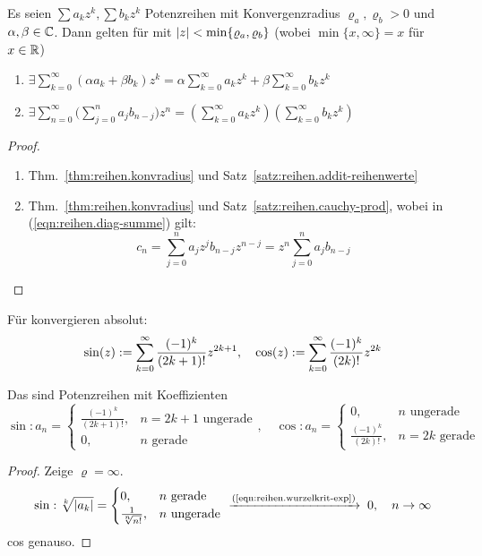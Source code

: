 \documentclass[12pt]{scrreprt}
\begin{document}
\begin{satz}\label{bsp:reihen.potreihe-reg}
Es seien $\sum a_kz^k, \sum b_kz^k$ Potenzreihen mit Konvergenzradius $\varrho_a, \varrho_b > 0$ und $\alpha, \beta \in \mathbb{C}$.
Dann gelten für  mit $\left\lvert z\right\lvert < \min \{\varrho_a, \varrho_b\}$ (wobei $\min \{x, \infty\} = x$ für $x\in\mathbb{R}$)
\begin{enumerate}
\item $\exists \sum\limits_{k=0}^\infty (\alpha a_k + \beta b_k) z^k = \alpha \sum\limits_{k=0}^\infty a_kz^k + \beta \sum\limits_{k=0}^\infty b_kz^k$\label{bsp:reihen.potreihe-reg.a}

\item $\exists \sum\limits_{n=0}^\infty \biggl(\sum\limits_{j=0}^n a_jb_{n-j}\biggr)z^n = \left(\sum\limits_{k=0}^\infty a_kz^k\right)\left(\sum\limits_{k=0}^\infty b_kz^k\right)$\label{bsp:reihen.potreihe-reg.b}
\end{enumerate}
\end{satz}
\begin{proof}
\begin{enumerate}
\item Thm.~\ref{thm:reihen.konvradius} und Satz~\ref{satz:reihen.addit-reihenwerte}
\item Thm.~\ref{thm:reihen.konvradius} und Satz~\ref{satz:reihen.cauchy-prod}, wobei in (\ref{eqn:reihen.diag-summe}) gilt:
\[c_n = \sum_{j=0}^n a_jz^jb_{n-j}z^{n-j} = z^n \sum_{j=0}^n a_j b_{n-j}\]
\end{enumerate}
\end{proof}

\begin{bsp}\label{bsp:reihen.sin-cos}
Für  konvergieren absolut:
\[\sin(z) := \sum_{k=0}^\infty \frac{(-1)^k}{(2k+1)!} z^{2k+1},\quad
\cos(z) := \sum_{k=0}^\infty \frac{(-1)^k}{(2k)!} z^{2k}\]

\noindent Das sind Potenzreihen mit Koeffizienten
\[\sin\colon a_n = \begin{cases}
\frac{(-1)^k}{(2k+1)!}, & n= 2k+1 \text{ ungerade}\\
0, & \text{$n$ gerade}
\end{cases},\quad
\cos\colon a_n = \begin{cases}
0, & \text{$n$ ungerade}\\
\frac{(-1)^k}{(2k)!}, & n= 2k \text{ gerade}
\end{cases}\]
\end{bsp}
\begin{proof}
Zeige $\varrho = \infty$. \[\sin: \sqrt[k]{\abs{a_k}} = 
\begin{cases}
0, & n\text{ gerade}\\
\frac{1}{\sqrt[n]{n!}}, & n\text{ ungerade}
\end{cases} \tonach{(\ref{eqn:reihen.wurzelkrit-exp})} 0,\quad\ninf\]
cos genauso.
\end{proof}
\end{document}
